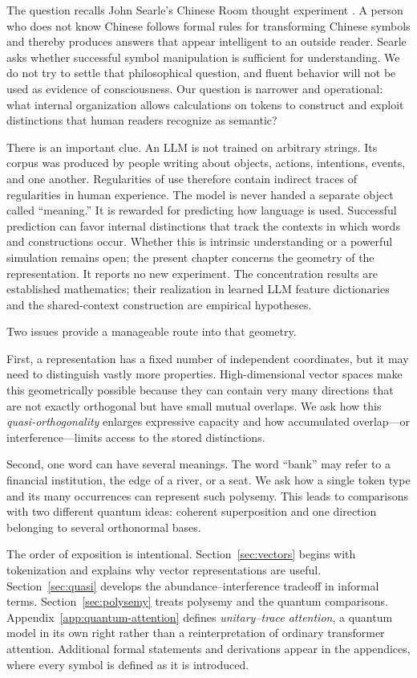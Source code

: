 \documentclass[
  aps,
  reprint,
  superscriptaddress,
  floatfix,
  nofootinbib,
  longbibliography
]{revtex4-2}
\begin{document}
The question recalls John Searle's Chinese Room thought experiment
\cite{searl-80a}.  A person who does not know Chinese follows formal rules for
transforming Chinese symbols and thereby produces answers that appear
intelligent to an outside reader.  Searle asks whether successful symbol
manipulation is sufficient for understanding.  We do not try to settle that
philosophical question, and fluent behavior will not be used as evidence of
consciousness.  Our question is narrower and operational: what internal
organization allows calculations on tokens to construct and exploit distinctions that
human readers recognize as semantic?

There is an important clue.  An LLM is not trained on arbitrary strings.
Its corpus was produced by people writing about objects, actions, intentions,
events, and one another.  Regularities of use therefore contain indirect
traces of regularities in human experience.  The model is never handed a
separate object called ``meaning.''  It is rewarded for predicting how
language is used.  Successful prediction can favor internal distinctions that
track the contexts in which words and constructions occur.  Whether this is
intrinsic understanding or a powerful simulation remains open; the present
chapter concerns the geometry of the representation.  It reports no new
experiment.  The concentration results are established mathematics; their
realization in learned LLM feature dictionaries and the shared-context
construction are empirical hypotheses.

Two issues provide a manageable route into that geometry.

First, a representation has a fixed number of independent coordinates, but it
may need to distinguish vastly more properties.  High-dimensional vector
spaces make this geometrically possible because they can contain very many directions that
are not exactly orthogonal but have small mutual overlaps.  We ask how this
\emph{quasi-orthogonality} enlarges expressive capacity and how accumulated
overlap---or interference---limits access to the stored distinctions.

Second, one word can have several meanings.  The word ``bank'' may refer to a
financial institution, the edge of a river, or a seat.  We ask how a single
token type and its many occurrences can represent such polysemy.  This leads
to comparisons with two different quantum ideas: coherent superposition and
one direction belonging to several orthonormal bases.

The order of exposition is intentional.  Section~\ref{sec:vectors} begins
with tokenization and explains why vector representations are useful.
Section~\ref{sec:quasi} develops the abundance--interference tradeoff in
informal terms.  Section~\ref{sec:polysemy} treats polysemy and the quantum
comparisons.  Appendix~\ref{app:quantum-attention} defines
\emph{unitary--trace attention}, a quantum model in its own right rather than
a reinterpretation of ordinary transformer attention.  Additional formal
statements and derivations appear in the
appendices, where every symbol is defined as it is introduced.
\end{document}
